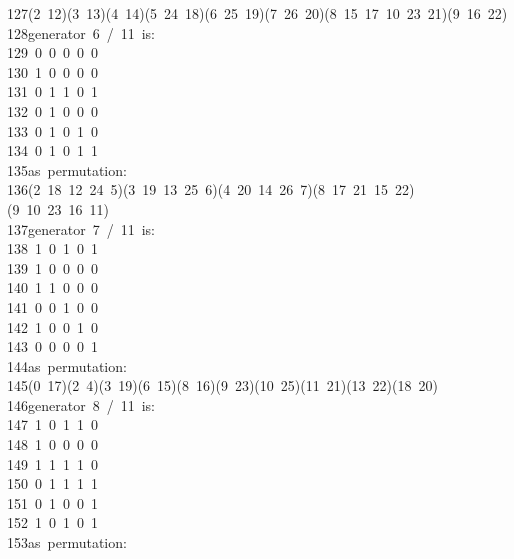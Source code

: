 \begin{tabbing}
127\>(2\ 12)(3\ 13)(4\ 14)(5\ 24\ 18)(6\ 25\ 19)(7\ 26\ 20)(8\ 15\ 17\ 10\ 23\ 21)(9\ 16\ 22)\\[0pt]
128\>generator\ 6\ /\ 11\ is:\ \\[0pt]
129\ 0\ 0\ 0\ 0\ 0\ \\[0pt]
130\ 1\ 0\ 0\ 0\ 0\ \\[0pt]
131\ 0\ 1\ 1\ 0\ 1\ \\[0pt]
132\ 0\ 1\ 0\ 0\ 0\ \\[0pt]
133\ 0\ 1\ 0\ 1\ 0\ \\[0pt]
134\ 0\ 1\ 0\ 1\ 1\ \\[0pt]
135\>as\ permutation:\ \\[0pt]
136\>(2\ 18\ 12\ 24\ 5)(3\ 19\ 13\ 25\ 6)(4\ 20\ 14\ 26\ 7)(8\ 17\ 21\ 15\ 22)(9\ 10\ 23\ 16\ 11)\\[0pt]
137\>generator\ 7\ /\ 11\ is:\ \\[0pt]
138\ 1\ 0\ 1\ 0\ 1\ \\[0pt]
139\ 1\ 0\ 0\ 0\ 0\ \\[0pt]
140\ 1\ 1\ 0\ 0\ 0\ \\[0pt]
141\ 0\ 0\ 1\ 0\ 0\ \\[0pt]
142\ 1\ 0\ 0\ 1\ 0\ \\[0pt]
143\ 0\ 0\ 0\ 0\ 1\ \\[0pt]
144\>as\ permutation:\ \\[0pt]
145\>(0\ 17)(2\ 4)(3\ 19)(6\ 15)(8\ 16)(9\ 23)(10\ 25)(11\ 21)(13\ 22)(18\ 20)\\[0pt]
146\>generator\ 8\ /\ 11\ is:\ \\[0pt]
147\ 1\ 0\ 1\ 1\ 0\ \\[0pt]
148\ 1\ 0\ 0\ 0\ 0\ \\[0pt]
149\ 1\ 1\ 1\ 1\ 0\ \\[0pt]
150\ 0\ 1\ 1\ 1\ 1\ \\[0pt]
151\ 0\ 1\ 0\ 0\ 1\ \\[0pt]
152\ 1\ 0\ 1\ 0\ 1\ \\[0pt]
153\>as\ permutation:\ \\[0pt]

\end{tabbing}
